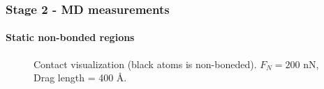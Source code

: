 \documentclass[
	10pt, %
]{beamer}
\begin{document}
\begin{frame}
	\frametitle{Stage 2 - MD measurements}
	\framesubtitle{Static non-bonded regions}


	\begin{figure}
		\centering    
		\caption{Contact visualization (black atoms is non-boneded). $F_N = 200$ nN, Drag length = 400 Å.}
   \end{figure} 

\end{frame}



\end{document}
